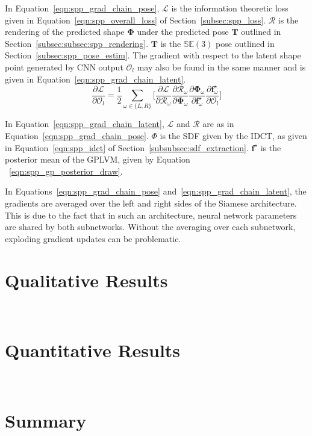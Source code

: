 In Equation~\ref{eqn:spp_grad_chain_pose}, \( \mathcal{L} \) is the information theoretic loss 
given in Equation~\ref{eqn:spp_overall_loss} of Section~\ref{subsec:spp_loss}.
\( \mathcal{R} \) is the rendering of the predicted shape \( \bm{\Phi} \) under the predicted 
pose \( \bm{T} \) outlined in Section~\ref{subsec:subsec:spp_rendering}. \( \bm{T} \) is the 
\( \mathbb{SE}(3) \) pose outlined in Section~\ref{subsec:spp_pose_estim}. The gradient with respect 
to the latent shape point generated by CNN output \( \mathcal{O}_{l} \) may also be found in the same 
manner and is given in Equation~\ref{eqn:spp_grad_chain_latent}.
\begin{equation}
  \label{eqn:spp_grad_chain_latent}
  \frac{\partial \mathcal{L}}{\partial \mathcal{O}_{l}} = 
  \frac{1}{2} \sum_{\omega \in \{L, R\}} \Bigg[
    \frac{\partial \mathcal{L}}{\partial \mathcal{R}_{\omega}}
    \frac{\partial \mathcal{R}_{\omega}}{\partial \mathcal{\bm{\Phi}}_{\omega}}
    \frac{\partial \bm{\Phi}_{\omega}}{\partial \bm{f}^{\star}_{\omega}}
    \frac{\partial \bm{f}^{\star}_{\omega}}{\partial \mathcal{O}_{l}}
  \Bigg]
\end{equation}

In Equation~\ref{eqn:spp_grad_chain_latent}, \( \mathcal{L} \) and \( \mathcal{R} \) 
are as in Equation~\ref{eqn:spp_grad_chain_pose}. \( \Phi \) is the SDF given by the IDCT, 
as given in Equation~\ref{eqn:spp_idct} of Section~\ref{subsubsec:sdf_extraction}. 
\( \bm{f}^{\star} \) is the posterior mean of the GPLVM, given by Equation
~\ref{eqn:spp_gp_posterior_draw}.

In Equations~\ref{eqn:spp_grad_chain_pose} and~\ref{eqn:spp_grad_chain_latent}, the gradients 
are averaged over the left and right sides of the Siamese architecture. This is due to the fact 
that in such an architecture, neural network parameters are shared by both subnetworks. Without 
the averaging over each subnetwork, exploding gradient updates can be problematic.

\section{Qualitative Results}
~\label{sec:spp_qualitative}

\section{Quantitative Results}
~\label{sec:spp_quantitative}

\section{Summary}
~\label{sec:spp_discussion}